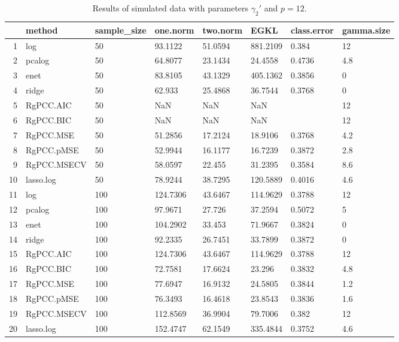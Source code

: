\begin{table}[ht]
\centering
\begin{tabular}{rlllllll}
  \hline
 & method & sample\_size & one.norm & two.norm & EGKL & class.error & gamma.size \\ 
  \hline
1 & log & 50 & 93.1122 & 51.0594 & 881.2109 & 0.384 & 12 \\ 
  2 & pcalog & 50 & 64.8077 & 23.1434 & 24.4558 & 0.4736 & 4.8 \\ 
  3 & enet & 50 & 83.8105 & 43.1329 & 405.1362 & 0.3856 & 0 \\ 
  4 & ridge & 50 & 62.933 & 25.4868 & 36.7544 & 0.3768 & 0 \\ 
  5 & RgPCC.AIC & 50 & NaN & NaN & NaN &  & 12 \\ 
  6 & RgPCC.BIC & 50 & NaN & NaN & NaN &  & 12 \\ 
  7 & RgPCC.MSE & 50 & 51.2856 & 17.2124 & 18.9106 & 0.3768 & 4.2 \\ 
  8 & RgPCC.pMSE & 50 & 52.9944 & 16.1177 & 16.7239 & 0.3872 & 2.8 \\ 
  9 & RgPCC.MSECV & 50 & 58.0597 & 22.455 & 31.2395 & 0.3584 & 8.6 \\ 
  10 & lasso.log & 50 & 78.9244 & 38.7295 & 120.5889 & 0.4016 & 4.6 \\ 
  11 & log & 100 & 124.7306 & 43.6467 & 114.9629 & 0.3788 & 12 \\ 
  12 & pcalog & 100 & 97.9671 & 27.726 & 37.2594 & 0.5072 & 5 \\ 
  13 & enet & 100 & 104.2902 & 33.453 & 71.9667 & 0.3824 & 0 \\ 
  14 & ridge & 100 & 92.2335 & 26.7451 & 33.7899 & 0.3872 & 0 \\ 
  15 & RgPCC.AIC & 100 & 124.7306 & 43.6467 & 114.9629 & 0.3788 & 12 \\ 
  16 & RgPCC.BIC & 100 & 72.7581 & 17.6624 & 23.296 & 0.3832 & 4.8 \\ 
  17 & RgPCC.MSE & 100 & 77.6947 & 16.9132 & 24.5805 & 0.3844 & 1.2 \\ 
  18 & RgPCC.pMSE & 100 & 76.3493 & 16.4618 & 23.8543 & 0.3836 & 1.6 \\ 
  19 & RgPCC.MSECV & 100 & 112.8569 & 36.9904 & 79.7006 & 0.382 & 12 \\ 
  20 & lasso.log & 100 & 152.4747 & 62.1549 & 335.4844 & 0.3752 & 4.6 \\ 
   \hline
\end{tabular}
\caption{Results of simulated data with parameters $\gamma_2'$ and $p =12$. } 
\label{fig-2'-nonlead-new-algo-12-metrics-p}
\end{table}
